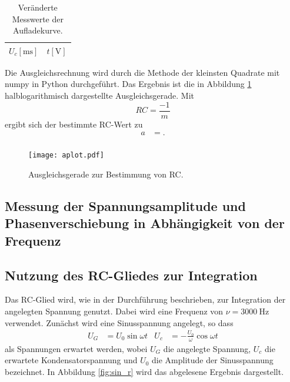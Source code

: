 \begin{table}[H]
  \centering
  \caption{Veränderte Messwerte der Aufladekurve.}
  \label{tab:werte_a_neu}
  \begin{tabular}{c c}
    \toprule
    {$U_c [\si{\milli\second}]$} & {$t [\si{\volt}]$}\\
    \midrule
    
    \bottomrule
  \end{tabular}
\end{table}

Die Ausgleichsrechnung wird durch die Methode der kleinsten Quadrate mit numpy in Python durchgeführt.
Das Ergebnis ist die in Abbildung \ref{fig:plot_a} halblogarithmisch dargestellte Ausgleichsgerade.
Mit
\begin{equation}
  RC = \frac{-1}{m}
\end{equation}
ergibt sich der bestimmte RC-Wert zu
\begin{align}
  a &= . \\
\end{align}
\begin{figure}[H]
  \centering
  \texttt{[image: aplot.pdf]}
  \caption{Ausgleichsgerade zur Bestimmung von RC.}
  \label{fig:plot_a}
\end{figure}

\subsection{Messung der Spannungsamplitude und Phasenverschiebung in Abhängigkeit von der Frequenz}


\subsection{Nutzung des RC-Gliedes zur Integration}
Das RC-Glied wird, wie in der Durchführung beschrieben, zur Integration der angelegten Spannung genutzt.
Dabei wird eine Frequenz von $\nu = \SI{3000}{\hertz}$ verwendet.
Zunächst wird eine Sinusspannung angelegt, so dass
\begin{align}
U_G &= U_0\sin{\omega t}  & U_c &= -\frac{U_0}{\omega}\cos{\omega t}
\end{align}
als Spannungen erwartet werden, wobei $U_G$ die angelegte Spannung, $U_c$ die erwartete Kondensatorspannung und $U_0$ die Amplitude der Sinusspannung bezeichnet.
In Abbildung \ref{fig:sin_r} wird das abgelesene Ergebnis dargestellt.

